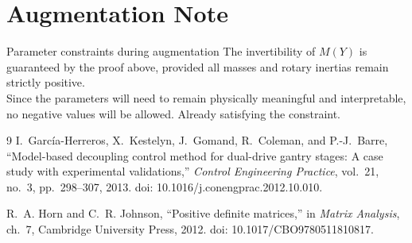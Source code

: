 \documentclass[11pt]{article}
\begin{document}



\section{Augmentation Note}

\begin{warningbox}{Parameter constraints during augmentation}
The invertibility of $M(Y)$ is guaranteed by the proof above, provided all
masses and rotary inertias remain strictly positive.
\\
Since the parameters will need to remain physically meaningful and interpretable, no negative values will be allowed.  Already satisfying the constraint.

\end{warningbox}

\newpage
\begin{thebibliography}{9}
I.~Garc{\'i}a-Herreros, X.~Kestelyn, J.~Gomand, R.~Coleman, and P.-J.~Barre,
``Model-based decoupling control method for dual-drive gantry stages:
A case study with experimental validations,''
\textit{Control Engineering Practice}, vol.~21, no.~3, pp.~298--307, 2013.
doi: 10.1016/j.conengprac.2012.10.010.

R.~A. Horn and C.~R. Johnson,
``Positive definite matrices,''                                                                        
in \textit{Matrix Analysis}, ch.~7,
Cambridge University Press, 2012.
doi: 10.1017/CBO9780511810817.
\end{thebibliography}
\end{document}
